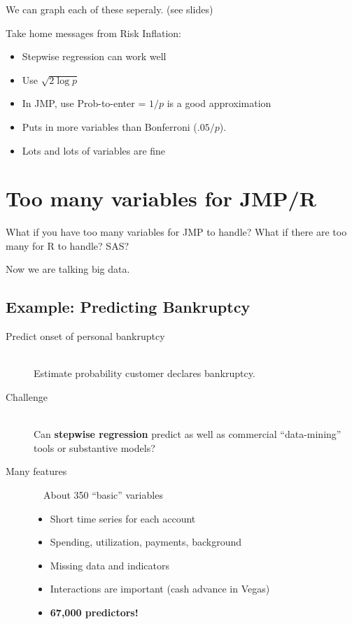 \documentclass[12pt]{extarticle} %
\begin{document}
We can graph each of these seperaly.  (see slides)


Take home messages from Risk Inflation:
\begin{itemize}
\item Stepwise regression can work well
\item Use $\sqrt{2 \log p}$ 
\item In JMP, use Prob-to-enter = $1/p$ is a good approximation
\item Puts in more variables than Bonferroni ($.05/p$).
\item Lots and lots of variables are fine
\end{itemize}
\section{Too many variables for JMP/R}

What if you have too many variables for JMP to handle?  What if there
are too many for R to handle?  SAS?  

Now we are talking big data.
\subsection{Example: Predicting Bankruptcy  }
\begin{description}

\item[ Predict onset of personal bankruptcy ] \ \\
  Estimate probability customer declares bankruptcy.
  
\item[Challenge] \ \\
  Can {\bf stepwise regression} predict as well as
  commercial ``data-mining'' tools or substantive models?

\item[ Many features ] \ \  About 350 ``basic'' variables
  \begin{itemize}
      \item Short time series for each account
      \item Spending, utilization, payments, background
      \item Missing data and indicators
      \item Interactions are important (cash advance in Vegas)
      \item {\bf 67,000 predictors!}
  \end{itemize}
\end{description}
\end{document}

